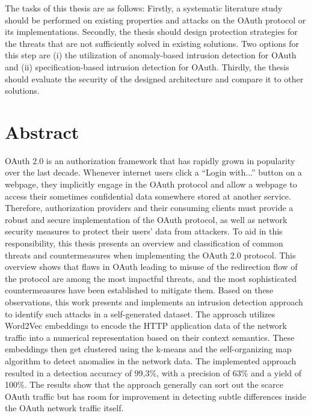 \documentclass[
    fontsize=12pt,
    headings=small,
    parskip=half,           %
    bibliography=totoc,
    numbers=noenddot,       %
    open=any,               %
    ]{scrreprt}
\begin{document}
The tasks of this thesis are as follows: Firstly, a systematic literature study should be performed on existing properties and attacks on the OAuth protocol or its implementations. Secondly, the thesis should design protection strategies for the threats that are not sufficiently solved in existing solutions. Two options for this step are (i) the utilization of anomaly-based intrusion detection for OAuth and (ii) specification-based intrusion detection for OAuth. Thirdly, the thesis should evaluate the security of the designed architecture and compare it to other solutions.

\chapter*{Abstract}
OAuth 2.0 is an authorization framework that has rapidly grown in popularity over the last decade. Whenever internet users click a ``Login with...'' button on a webpage, they implicitly engage in the OAuth protocol and allow a webpage to access their sometimes confidential data somewhere stored at another service. Therefore, authorization providers and their consuming clients must provide a robust and secure implementation of the OAuth protocol, as well as network security measures to protect their users' data from attackers. To aid in this responsibility, this thesis presents an overview and classification of common threats and countermeasures when implementing the OAuth 2.0 protocol. This overview shows that flaws in OAuth leading to misuse of the redirection flow of the protocol are among the most impactful threats, and the most sophisticated countermeasures have been established to mitigate them. Based on these observations, this work presents and implements an intrusion detection approach to identify such attacks in a self-generated dataset. The approach utilizes Word2Vec embeddings to encode the HTTP application data of the network traffic into a numerical representation based on their context semantics. These embeddings then get clustered using the k-means and the self-organizing map algorithm to detect anomalies in the network data. The implemented approach resulted in a detection accuracy of 99,3\%, with a precision of 63\% and a yield of 100\%. The results show that the approach generally can sort out the scarce OAuth traffic but has room for improvement in detecting subtle differences inside the OAuth network traffic itself.

\tableofcontents
\end{document}
